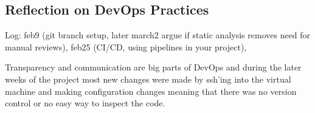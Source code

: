 \subsection{Reflection on DevOps Practices}
Log: feb9 (git branch setup, later march2 argue if static analysis removes need for manual reviews), feb25 (CI/CD, using pipelines in your project),

Transparency and communication are big parts of DevOps and during the later weeks of the project most new changes were made by ssh'ing into the virtual machine and making configuration changes meaning that there was no version control or no easy way to inspect the code.